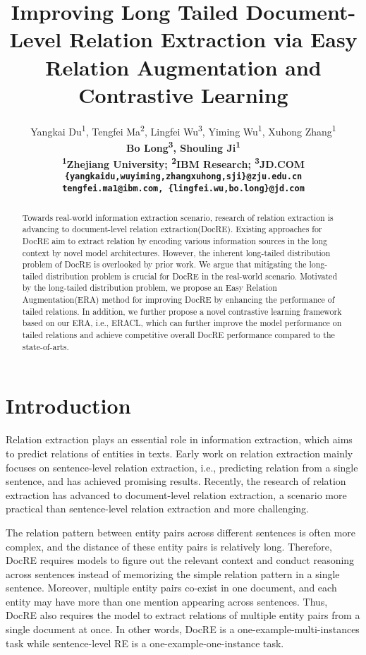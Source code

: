 \documentclass[11pt]{article}
\title{Improving Long Tailed Document-Level Relation Extraction via Easy Relation Augmentation and Contrastive Learning}
\author{Yangkai Du\textsuperscript{1}, Tengfei Ma\textsuperscript{2}, Lingfei Wu\textsuperscript{3}, Yiming Wu\textsuperscript{1}, Xuhong Zhang\textsuperscript{1} \\\bf{Bo Long}\textsuperscript{3}, \bf{Shouling Ji}\textsuperscript{1} \\
        \textsuperscript{1}Zhejiang University; \textsuperscript{2}IBM Research; 
        \textsuperscript{3}JD.COM\\
        \texttt{\{{yangkaidu,wuyiming,zhangxuhong,sji}\}@zju.edu.cn} \\
        \texttt{tengfei.ma1@ibm.com, \{lingfei.wu,bo.long\}@jd.com}
        }
\begin{document}
\maketitle
\begin{abstract}
Towards real-world information extraction scenario, research of relation extraction is advancing to document-level relation extraction(DocRE). Existing approaches for DocRE aim to extract relation by encoding various information sources in the long context by novel model architectures. However, the inherent long-tailed distribution problem of DocRE is overlooked by prior work. We argue that mitigating the long-tailed distribution problem is crucial for DocRE in the real-world scenario. Motivated by the long-tailed distribution problem, we propose an Easy Relation Augmentation(ERA) method for improving DocRE by enhancing the performance of tailed relations. In addition, we further propose a novel contrastive learning framework based on our ERA, i.e., ERACL, which can further improve the model performance on tailed relations and achieve competitive overall DocRE performance compared to the state-of-arts. 

\end{abstract}

\section{Introduction}
Relation extraction plays an essential role in information extraction, which aims to predict relations of entities in texts. Early work on relation extraction mainly focuses on sentence-level relation extraction, i.e., predicting relation from a single sentence, and has achieved promising results. Recently, the research of relation extraction has advanced to document-level relation extraction, a scenario more practical than sentence-level relation extraction and more challenging.

The relation pattern between entity pairs across different sentences is often more complex, and the distance of these entity pairs is relatively long. Therefore, DocRE requires models to figure out the relevant context and conduct reasoning across sentences instead of memorizing the simple relation pattern in a single sentence. Moreover, multiple entity pairs co-exist in one document, and each entity may have more than one mention appearing across sentences. 
Thus, DocRE also requires the model to extract relations of multiple entity pairs from a single document at once. In other words, DocRE is a one-example-multi-instances task while sentence-level RE is a one-example-one-instance task.
\end{document}
